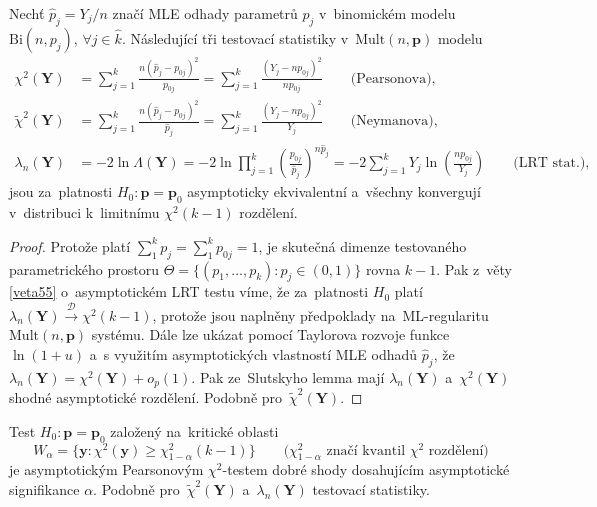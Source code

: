 \begin{theorem}\label{veta:Pearson3}
	Nechť $\widehat{p}_j=Y_j/n$ značí MLE odhady parametrů $p_j$ v~binomickém modelu $\mathrm{Bi}(n,p_j)$, $\forall j\in \widehat k$. Následující tři testovací statistiky v~$\mathrm{Mult}(n,\mathbf p)$ modelu
	\begin{align*}
	\chi^2(\mathbf Y) & = \sum_{j=1}^k \frac{n(\widehat{p}_j-p_{0j})^2}{p_{0j}}=  \sum_{j=1}^k \frac{(Y_j-np_{0j})^2}{np_{0j}} \qquad\text{(Pearsonova)}, \\
	\widetilde\chi^2(\mathbf Y) & = \sum_{j=1}^k \frac{n(\widehat{p}_j-p_{0j})^2}{\widehat{p}_j}= \sum_{j=1}^k \frac{(Y_j-np_{0j})^2}{Y_j} \qquad\text{(Neymanova)}, \\
	\lambda_n(\mathbf Y) & = -2\ln \Lambda(\mathbf Y)= -2\ln \prod_{j=1}^k \left(\frac{p_{0j}}{\widehat{p}_j}\right)^{n\widehat{p}_j} = -2 \sum_{j=1}^k Y_j \ln \left(\frac{np_{0j}}{Y_j}\right) \qquad\text{(LRT stat.)},
	\end{align*}
	jsou za~platnosti $H_0: \mathbf p=\mathbf p_0$ asymptoticky ekvivalentní a~všechny konvergují v~distribuci k~limitnímu $\chi^2(k-1)$ rozdělení.
\end{theorem}

\begin{proof}
	Protože platí $\sum_1^k p_j=\sum_1^k p_{0j}=1$, je skutečná dimenze testovaného parametrického prostoru $\Theta=\{(p_1,\ldots,p_k): p_j\in(0,1)\}$ rovna $k-1$. Pak z~věty \ref{veta55} o~asymptotickém LRT testu víme, že za~platnosti $H_0$ platí $ \lambda_n (\mathbf Y) \stackrel{\mathscr{D}}{\longrightarrow} \chi^2(k-1)$, protože jsou naplněny předpoklady na~ML-regularitu $\mathrm{Mult}(n,\mathbf p)$ systému. Dále lze ukázat pomocí Taylorova rozvoje funkce\\ $\ln (1+u)$ a~s využitím asymptotických vlastností MLE odhadů $\widehat{p}_j$, že\\ $\lambda_n(\mathbf Y)=\chi^2(\mathbf Y) + o_p(1)$. Pak ze~Slutskyho lemma mají $\lambda_n(\mathbf Y)$ a~$\chi^2(\mathbf Y)$ shodné asymptotické rozdělení. Podobně pro~$\widetilde\chi^2(\mathbf Y)$.
\end{proof}

\begin{dusl}
	Test $H_0: \mathbf p = \mathbf p_0$ založený na~kritické oblasti
	$$ W_\alpha=\Big\{ \mathbf y: \chi^2(\mathbf y) \geqslant \chi^2_{1-\alpha}(k-1)\Big\} \qquad (\chi^2_{1-\alpha}\text{ značí kvantil }\chi^2\text{ rozdělení)}$$
	je asymptotickým Pearsonovým $\chi^2$-testem dobré shody dosahujícím asymptotické signifikance $\alpha$. Podobně pro~$\widetilde\chi^2(\mathbf Y)$ a~$\lambda_n(\mathbf Y)$ testovací statistiky.
\end{dusl}

